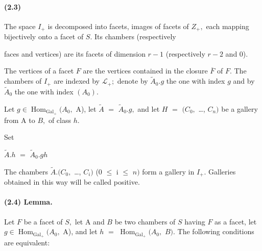 \documentclass[10pt,a4paper]{article}
\begin{document}
\paragraph{(2.3)} The space \ensuremath{I_+} is decomposed into facets, images of facets of \ensuremath{Z_+,} each mapping bijectively onto a facet of \ensuremath{S.} Its chambers (respectively


faces and vertices) are its facets of dimension \ensuremath{r-1} (respectively \ensuremath{r-2} and 0).\par

The vertices of a facet \ensuremath{F} are the vertices contained in the closure \ensuremath{\overline{F}} of \ensuremath{F.} The chambers of \ensuremath{I_+} are indexed by \ensuremath{\mathcal{L}_+;} denote by \ensuremath{\widetilde{A}_0.g} the one with index \ensuremath{g} and by \ensuremath{\widetilde{A}_0} the one with index \ensuremath{(A_0).}\par

Let \ensuremath{g\in{}\operatorname{Hom}_{\operatorname{Gal}_+}(A_0,} A), let \ensuremath{\widetilde{A}} \ensuremath{=} \ensuremath{\widetilde{A}_0.g,} and let \ensuremath{H} \ensuremath{=} \ensuremath{(C_0,} \ldots{}, \ensuremath{C_n)} be a gallery from A to \ensuremath{B,} of class \ensuremath{h.}\par

Set\par

\ensuremath{\widetilde{A}.h} \ensuremath{=} \ensuremath{\widetilde{A}_0.gh}\par

The chambers \ensuremath{\widetilde{A}.(C_0,} \ldots{}, \ensuremath{C_i)} (0 \ensuremath{\le{}} i \ensuremath{\le{}} \ensuremath{n)} form a gallery in \ensuremath{I_+.} Galleries obtained in this way will be called positive.\par

\paragraph{(2.4) Lemma.} Let \ensuremath{F} be a facet of \ensuremath{S,} let A and \ensuremath{B} be two chambers of \ensuremath{S} having \ensuremath{F} as a facet, let \ensuremath{g\in{}\operatorname{Hom}_{\operatorname{Gal}_+}(A_0,} A), and let \ensuremath{h} \ensuremath{=} \ensuremath{\operatorname{Hom}_{\operatorname{Gal}_+}(A_0,} \ensuremath{B).} The following conditions are equivalent:
\end{document}
